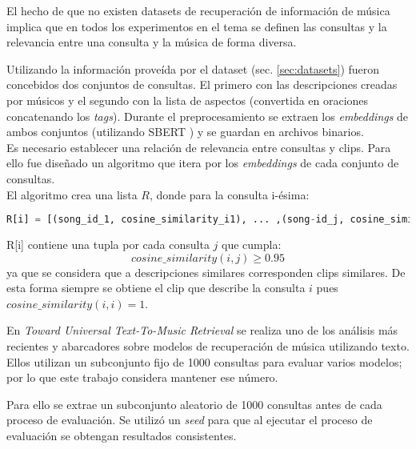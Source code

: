 El hecho de que no existen datasets de recuperación de información de música implica que en todos los experimentos en el tema se definen las consultas y la relevancia entre una consulta y la música de forma diversa.

Utilizando la información proveída por el dataset (sec. \ref{sec:datasets}) fueron concebidos dos conjuntos de consultas. El primero con las descripciones creadas por músicos y el segundo con la lista de aspectos (convertida en oraciones concatenando los \textit{tags}). Durante el preprocesamiento se extraen los \textit{embeddings} de ambos conjuntos (utilizando SBERT \cite{Reimers2019SentenceBERTSE}) y se guardan en archivos binarios. \\
Es necesario establecer una relación de relevancia entre consultas y clips. Para ello fue diseñado un algoritmo que itera por los \textit{embeddings} de cada conjunto de consultas. \\
El algoritmo crea una lista $R$, donde para la consulta i-ésima:
\begin{lstlisting}[language=Python]
R[i] = [(song_id_1, cosine_similarity_i1), ... ,(song-id_j, cosine_similarity_ij)]
\end{lstlisting}
R[i] contiene una tupla por cada consulta $j$ que cumpla: $$cosine\_similarity(i,j) \geq 0.95$$ ya que se considera que a descripciones similares corresponden clips similares. De esta forma siempre se obtiene el clip que describe la consulta $i$ pues $cosine\_similarity(i,i) = 1$.
 
En \textit{Toward Universal Text-To-Music Retrieval} \cite{Doh2022TowardUT} se realiza uno de los análisis más recientes y abarcadores sobre modelos de recuperación de música utilizando texto. Ellos utilizan un subconjunto fijo de 1000 consultas para evaluar varios modelos; por lo que este trabajo considera mantener ese número.

Para ello se extrae un subconjunto aleatorio de 1000 consultas antes de cada proceso de evaluación. Se utilizó un \textit{seed} para que al ejecutar el proceso de evaluación se obtengan resultados consistentes. 

